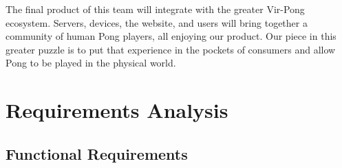 \documentclass[12pt]{article}
\begin{document}
The final product of this team will integrate with the greater Vir-Pong 
ecosystem.  Servers, devices, the website, and users will bring together a 
community of human Pong players, all enjoying our product.  Our piece in 
this greater puzzle is to put that experience in the pockets of consumers 
and allow Pong to be played in the physical world.

\section{Requirements Analysis}
\label{sec:requirements}

\subsection{Functional Requirements}
\label{sec:functionalRequirements}

\singlespacing
\end{document}
